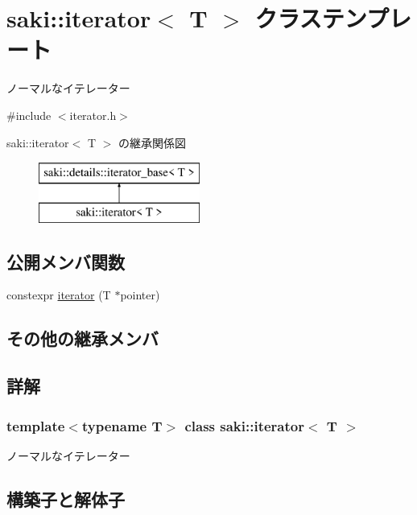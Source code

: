 \hypertarget{classsaki_1_1iterator}{}\section{saki\+:\+:iterator$<$ T $>$ クラステンプレート}
\label{classsaki_1_1iterator}


ノーマルなイテレーター  




{\ttfamily \#include $<$iterator.\+h$>$}

saki\+:\+:iterator$<$ T $>$ の継承関係図\begin{figure}[H]
\begin{center}
\leavevmode
\includegraphics[height=2.000000cm]{classsaki_1_1iterator}
\end{center}
\end{figure}
\subsection*{公開メンバ関数}
\begin{DoxyCompactItemize}
\item 
constexpr \mbox{\hyperlink{classsaki_1_1iterator_aaf66a5b986033d29630294dd2646bec3}{iterator}} (T $\ast$pointer)
\end{DoxyCompactItemize}
\subsection*{その他の継承メンバ}


\subsection{詳解}
\subsubsection*{template$<$typename T$>$\newline
class saki\+::iterator$<$ T $>$}

ノーマルなイテレーター 

\subsection{構築子と解体子}
\mbox{\label{classsaki_1_1iterator_aaf66a5b986033d29630294dd2646bec3}} 

